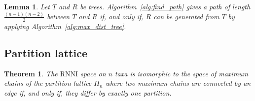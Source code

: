 \documentclass[11pt, a4paper]{article}
\newcommand{\rnni}{\mathrm{RNNI}}
\newtheorem{theorem}[definition]{Theorem}
\newtheorem{lemma}[definition]{Lemma}
\begin{document}
\begin{lemma}
    Let $T$ and $R$ be trees.
    Algorithm~\ref{alg:find_path} gives a path of length $\frac{(n-1)(n-2)}{2}$ between $T$ and $R$ if, and only if, $R$ can be generated from $T$ by applying Algorithm~\ref{alg:max_dist_tree}.
\end{lemma}



\subsection{Partition lattice}


\begin{theorem}
	The $\rnni$ space on $n$ taxa is isomorphic to the space of maximum chains of the partition lattice $\Pi_n$ where two maximum chains are connected by an edge if, and only if, they differ by exactly one partition.
\end{theorem}



\end{document}
